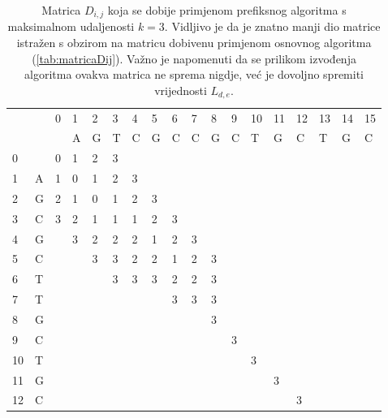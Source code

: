 \documentclass[times, utf8, zavrsni]{fer}
\begin{document}
\begin{table}[]
\centering
\begin{tabular}{|ll|llllllllllllllll|}
\hline
                         &   & 0 & 1 & 2 & 3 & 4 & 5 & 6 & 7 & 8 & 9 & 10 & 11 & 12 & 13 & 14 & 15 \\ \cline{3-18} 
                         &   &   & A & G & T & C & G & C & C & G & C & T  & G  & C  & T  & G  & C  \\ \hline
\multicolumn{1}{|l|}{0}  &   & 0 & 1 & 2 & 3 &   &   &   &   &   &   &    &    &    &    &    &    \\
\multicolumn{1}{|l|}{1}  & A & 1 & 0 & 1 & 2 & 3 &   &   &   &   &   &    &    &    &    &    &    \\
\multicolumn{1}{|l|}{2}  & G & 2 & 1 & 0 & 1 & 2 & 3 &   &   &   &   &    &    &    &    &    &    \\
\multicolumn{1}{|l|}{3}  & C & 3 & 2 & 1 & 1 & 1 & 2 & 3 &   &   &   &    &    &    &    &    &    \\
\multicolumn{1}{|l|}{4}  & G &   & 3 & 2 & 2 & 2 & 1 & 2 & 3 &   &   &    &    &    &    &    &    \\
\multicolumn{1}{|l|}{5}  & C &   &   & 3 & 3 & 2 & 2 & 1 & 2 & 3 &   &    &    &    &    &    &    \\
\multicolumn{1}{|l|}{6}  & T &   &   &   & 3 & 3 & 3 & 2 & 2 & 3 &   &    &    &    &    &    &    \\
\multicolumn{1}{|l|}{7}  & T &   &   &   &   &   &   & 3 & 3 & 3 &   &    &    &    &    &    &    \\
\multicolumn{1}{|l|}{8}  & G &   &   &   &   &   &   &   &   & 3 &   &    &    &    &    &    &    \\
\multicolumn{1}{|l|}{9}  & C &   &   &   &   &   &   &   &   &   & 3 &    &    &    &    &    &    \\
\multicolumn{1}{|l|}{10} & T &   &   &   &   &   &   &   &   &   &   & 3  &    &    &    &    &    \\
\multicolumn{1}{|l|}{11} & G &   &   &   &   &   &   &   &   &   &   &    & 3  &    &    &    &    \\
\multicolumn{1}{|l|}{12} & C &   &   &   &   &   &   &   &   &   &   &    &    & 3  &    &    &    \\ \hline
\end{tabular}
\caption{Matrica $D_{i,j}$ koja se dobije primjenom prefiksnog algoritma s maksimalnom udaljenosti $k=3$. Vidljivo je da je znatno manji dio matrice istražen s obzirom na matricu dobivenu primjenom osnovnog algoritma (\ref{tab:matricaDij}). Važno je napomenuti da se prilikom izvođenja algoritma ovakva matrica ne sprema nigdje, već je dovoljno spremiti vrijednosti $L_{d,e}$.}
\label{tab:matricaAlg2}
\end{table}
\end{document}
